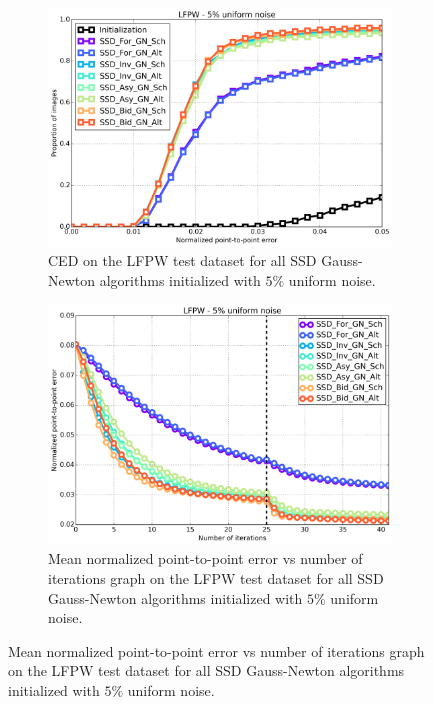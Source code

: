 \begin{figure}[h!]
	\centering
	\begin{subfigure}{0.48\textwidth}
	    \includegraphics[width=\textwidth]{experiments/algorithms/ssd_gn/ced_ssd_gn_5.png}
	    \caption{CED on the LFPW test dataset for all SSD Gauss-Newton algorithms initialized with $5\%$ uniform noise.}
	    \label{fig:ced_ssd_gn_5}
	\end{subfigure}
	\hfill
	\begin{subfigure}{0.48\textwidth}
	    \includegraphics[width=\textwidth]{experiments/algorithms/ssd_gn/mean_error_vs_iters_ssd_gn_5.png}
	    \caption{Mean normalized point-to-point error vs number of iterations graph on the LFPW test dataset for all SSD Gauss-Newton algorithms initialized with $5\%$ uniform noise.}
	    \label{fig:mean_error_vs_iters_ssd_gn_5}
	\end{subfigure}

\end{figure}
